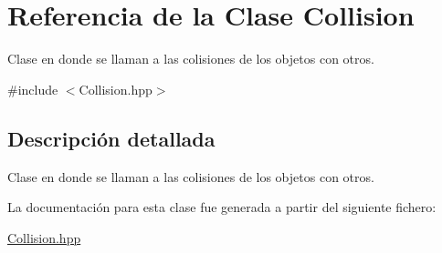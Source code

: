 \hypertarget{class_collision}{}\section{Referencia de la Clase Collision}
\label{class_collision}


Clase en donde se llaman a las colisiones de los objetos con otros.  




{\ttfamily \#include $<$Collision.\+hpp$>$}



\subsection{Descripción detallada}
Clase en donde se llaman a las colisiones de los objetos con otros. 

La documentación para esta clase fue generada a partir del siguiente fichero\+:\begin{DoxyCompactItemize}
\item 
\mbox{\hyperlink{_collision_8hpp}{Collision.\+hpp}}\end{DoxyCompactItemize}
